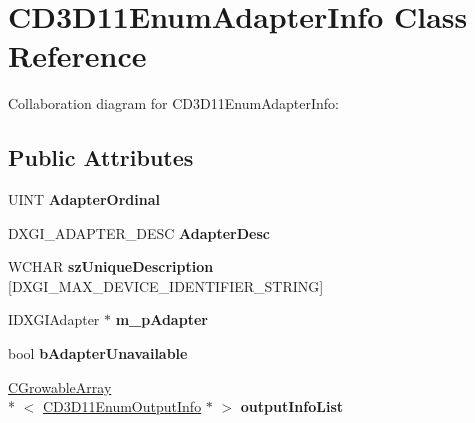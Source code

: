 \hypertarget{class_c_d3_d11_enum_adapter_info}{\section{C\+D3\+D11\+Enum\+Adapter\+Info Class Reference}
\label{class_c_d3_d11_enum_adapter_info}
}


Collaboration diagram for C\+D3\+D11\+Enum\+Adapter\+Info\+:
\subsection*{Public Attributes}
\begin{DoxyCompactItemize}
\item 
\hypertarget{class_c_d3_d11_enum_adapter_info_a597a3649a038baa3f9f5915571ce4661}{U\+I\+N\+T {\bfseries Adapter\+Ordinal}}\label{class_c_d3_d11_enum_adapter_info_a597a3649a038baa3f9f5915571ce4661}

\item 
\hypertarget{class_c_d3_d11_enum_adapter_info_a9981161d86976d3c9a7286cb0642d9fc}{D\+X\+G\+I\+\_\+\+A\+D\+A\+P\+T\+E\+R\+\_\+\+D\+E\+S\+C {\bfseries Adapter\+Desc}}\label{class_c_d3_d11_enum_adapter_info_a9981161d86976d3c9a7286cb0642d9fc}

\item 
\hypertarget{class_c_d3_d11_enum_adapter_info_ad4b84b40c62cfcbb3317bbf84e91bd44}{W\+C\+H\+A\+R {\bfseries sz\+Unique\+Description} \mbox{[}D\+X\+G\+I\+\_\+\+M\+A\+X\+\_\+\+D\+E\+V\+I\+C\+E\+\_\+\+I\+D\+E\+N\+T\+I\+F\+I\+E\+R\+\_\+\+S\+T\+R\+I\+N\+G\mbox{]}}\label{class_c_d3_d11_enum_adapter_info_ad4b84b40c62cfcbb3317bbf84e91bd44}

\item 
\hypertarget{class_c_d3_d11_enum_adapter_info_af79dc35d8a2e6671e381503933e6de08}{I\+D\+X\+G\+I\+Adapter $\ast$ {\bfseries m\+\_\+p\+Adapter}}\label{class_c_d3_d11_enum_adapter_info_af79dc35d8a2e6671e381503933e6de08}

\item 
\hypertarget{class_c_d3_d11_enum_adapter_info_aa1415a77e2fc951f91dbaa29c6a09cd0}{bool {\bfseries b\+Adapter\+Unavailable}}\label{class_c_d3_d11_enum_adapter_info_aa1415a77e2fc951f91dbaa29c6a09cd0}

\item 
\hypertarget{class_c_d3_d11_enum_adapter_info_a8fa75c52c8437b0b690b4988ecc5f534}{\hyperlink{class_c_growable_array}{C\+Growable\+Array}\\*
$<$ \hyperlink{class_c_d3_d11_enum_output_info}{C\+D3\+D11\+Enum\+Output\+Info} $\ast$ $>$ {\bfseries output\+Info\+List}}\label{class_c_d3_d11_enum_adapter_info_a8fa75c52c8437b0b690b4988ecc5f534}


\end{DoxyCompactItemize}
